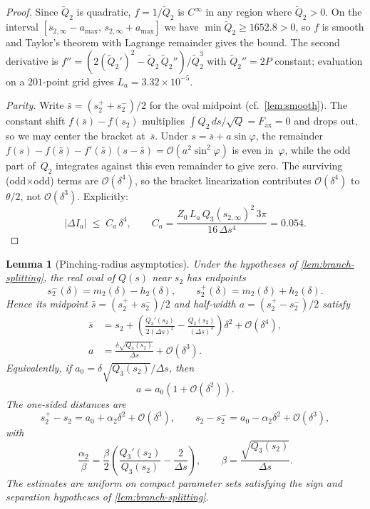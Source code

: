 \documentclass[11pt,a4paper]{article}
\theoremstyle{plain}
\newtheorem{lemma}[theorem]{Lemma}
\theoremstyle{definition}
\theoremstyle{remark}
\newcommand{\Oo}{\mathcal{O}}
\begin{document}
\begin{proof}
  Since $\tilde Q_2$ is quadratic, $f = 1/\tilde Q_2$ is $C^\infty$
  in any region where $\tilde Q_2 > 0$.  On the interval
  $[s_{2,\infty} - a_{\max},\, s_{2,\infty} + a_{\max}]$ we have
  $\min \tilde Q_2 \ge 1652.8 > 0$, so $f$ is smooth and
  Taylor's theorem with Lagrange remainder gives the bound.
  The second derivative is
  $f'' = (2(\tilde Q_2')^2 - \tilde Q_2\,\tilde Q_2'')/\tilde Q_2^3$
  with $\tilde Q_2'' = 2P$ constant; evaluation on a $201$-point
  grid gives $L_a = 3.32 \times 10^{-5}$.

  \smallskip
  \emph{Parity.}  Write $\bar s = (s_2^{+}+s_2^{-})/2$ for the
  oval midpoint (cf.\ \cref{lem:smooth}).  The constant shift
  $f(\bar s) - f(s_2)$ multiplies
  $\int Q_2\,ds/\!\sqrt{Q} = F_{\mathrm{ax}} = 0$
  and drops out, so we may center the bracket at~$\bar s$.
  Under $s = \bar s + a\sin\varphi$,
  the remainder
  $f(s) - f(\bar s) - f'(\bar s)(s{-}\bar s)
  = \Oo(a^2\sin^2\!\varphi)$
  is even in~$\varphi$, while the odd part of~$Q_2$
  integrates against this even remainder to give zero.
  The surviving (odd$\times$odd) terms are $\Oo(\delta^4)$,
  so the bracket linearization contributes $\Oo(\delta^4)$ to
  $\theta/2$, not $\Oo(\delta^3)$.
  Explicitly:
  \[
    \lvert\Delta I_a\rvert
    \;\le\; C_a\,\delta^4,
    \qquad
    C_a
    = \frac{Z_0\,L_a\,Q_3(s_{2,\infty})^2\,3\pi}
           {16\,\Delta s^4}
    = 0.054.
  \]
\end{proof}

\begin{lemma}[Pinching-radius asymptotics]\label{lem:pinching}
  Under the hypotheses of \cref{lem:branch-splitting}, the real oval
  of $Q(s)$ near $s_2$ has endpoints
  \[
    s_2^-(\delta)=m_2(\delta)-h_2(\delta),
    \qquad
    s_2^+(\delta)=m_2(\delta)+h_2(\delta).
  \]
  Hence its midpoint $\bar s=(s_2^++s_2^-)/2$ and half-width
  $a=(s_2^+-s_2^-)/2$ satisfy
  \begin{align}
    \bar s
    &=
    s_2+
    \left(
      \frac{Q_3'(s_2)}{2(\Delta s)^2}
      -
      \frac{Q_3(s_2)}{(\Delta s)^3}
    \right)\delta^2
    +\Oo(\delta^4),
    \label{eq:pinch-midpoint}\\
    a
    &=
    \frac{\delta\sqrt{Q_3(s_2)}}{\Delta s}
    +\Oo(\delta^3).
    \label{eq:a-expansion}
  \end{align}
  Equivalently, if
  $a_0=\delta\sqrt{Q_3(s_2)}/\Delta s$, then
  \[
    a=a_0(1+\Oo(\delta^2)).
  \]
  The one-sided distances are
  \[
    s_2^+-s_2
    =
    a_0+\alpha_2\delta^2+\Oo(\delta^3),
    \qquad
    s_2-s_2^-
    =
    a_0-\alpha_2\delta^2+\Oo(\delta^3),
  \]
  with
  \[
    \frac{\alpha_2}{\beta}
    =
    \frac{\beta}{2}
    \left(\frac{Q_3'(s_2)}{Q_3(s_2)}-\frac{2}{\Delta s}\right),
    \qquad
    \beta=\frac{\sqrt{Q_3(s_2)}}{\Delta s}.
  \]
  The estimates are uniform on compact parameter sets satisfying the
  sign and separation hypotheses of \cref{lem:branch-splitting}.
\end{lemma}
\end{document}
